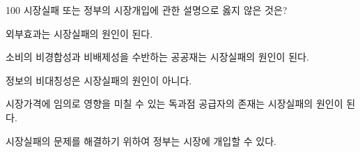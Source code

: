 \begin{question}{100}
시장실패 또는 정부의 시장개입에 관한 설명으로 옳지 않은 것은?
\begin{choices}
  \item 외부효과는 시장실패의 원인이 된다.
  \item 소비의 비경합성과 비배제성을 수반하는 공공재는 시장실패의 원인이 된다.
  \item 정보의 비대칭성은 시장실패의 원인이 아니다.
  \item 시장가격에 임의로 영향을 미칠 수 있는 독과점 공급자의 존재는 시장실패의 원인이 된다.
  \item 시장실패의 문제를 해결하기 위하여 정부는 시장에 개입할 수 있다.
\end{choices}
\end{question}
